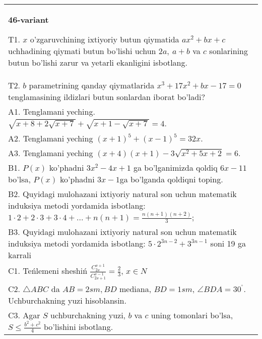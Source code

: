 \documentclass{article}
\begin{document}
\begin{tabular}{m{17cm}}
\textbf{46-variant}
\newline

T1. \(x\) o'zgaruvchining ixtiyoriy butun qiymatida \(ax^{2} + bx + c\) uchhadining qiymati butun bo'lishi uchun \(2a,\ a + b\) va \(c\) sonlarining butun bo'lishi zarur va yetarli ekanligini isbotlang. \\
T2. \(b\) parametrining qanday qiymatlarida \(x^{3} + 17x^{2} + bx - 17 = 0\) tenglamasining ildizlari butun sonlardan iborat bo'ladi? \\
A1. Tenglamani yeching. \(\sqrt{x + 8 + 2\sqrt{x + 7}} + \sqrt{x + 1 - \sqrt{x + 7}} = 4\). \\
A2. Tenglamani yeching \((x + 1)^{5} + (x - 1)^{5} = 32x\). \\
A3. Tenglamani yeching \((x + 4)(x + 1) - 3\sqrt{x^{2} + 5x + 2} = 6\). \\
B1. \(P(x)\) ko'phadni \(3x^{2} - 4x + 1\) ga bo'lganimizda qoldiq \(6x - 11\) bo'lsa, \(P(x)\) ko'phadni \(3x - 1\)ga bo'lganda qoldiqni toping. \\
B2. Quyidagi mulohazani ixtiyoriy natural son uchun matematik induksiya metodi yordamida isbotlang: \(1 \cdot 2 + 2 \cdot 3 + 3 \cdot 4 + ... + n(n + 1) = \frac{n(n + 1)(n + 2)}{3}\); \\
B3. Quyidagi mulohazani ixtiyoriy natural son uchun matematik induksiya metodi yordamida isbotlang: \(5 \cdot 2^{3n - 2} + 3^{3n - 1}\) soni 19 ga karrali \\
C1. Teńlemeni sheshiń \(\frac{C_{2x}^{x + 1}}{C_{2x + 1}^{x - 1}} = \frac{2}{3}\), \(x \in N\) \\
C2. \(\bigtriangleup ABC\) da \(AB = 2sm,BD\) mediana, \(BD = 1sm\), \(\angle BDA = 30^{{^\circ}}\). Uchburchakning yuzi hisoblansin. \\
C3. Agar \(S\) uchburchakning yuzi, \(b\) va \(c\) uning tomonlari bo'lsa, \(S \leq \frac{b^{2} + c^{2}}{4}\) bo'lishini isbotlang. \\

\end{tabular}
\vspace{1cm}
\end{document}
